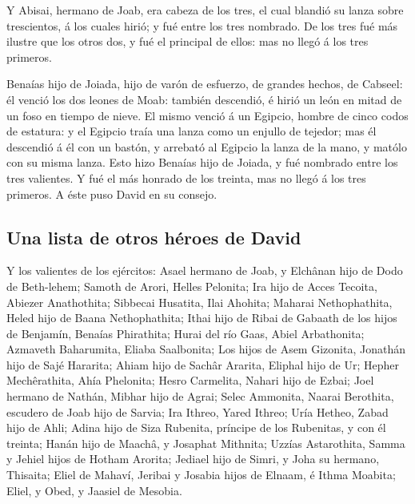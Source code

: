  Y Abisai, hermano de Joab, era cabeza de los tres, el cual
blandió su lanza sobre trescientos, á los cuales hirió; y fué entre los
tres nombrado.  De los tres fué más ilustre que los otros
dos, y fué el principal de ellos: mas no llegó á los tres primeros.

 Benaías hijo de Joiada, hijo de varón de esfuerzo, de
grandes hechos, de Cabseel: él venció los dos leones de Moab: también
descendió, é hirió un león en mitad de un foso en tiempo de nieve.
 El mismo venció á un Egipcio, hombre de cinco codos de
estatura: y el Egipcio traía una lanza como un enjullo de tejedor; mas
él descendió á él con un bastón, y arrebató al Egipcio la lanza de la
mano, y matólo con su misma lanza.  Esto hizo Benaías hijo
de Joiada, y fué nombrado entre los tres valientes.  Y fué
el más honrado de los treinta, mas no llegó á los tres primeros. A éste
puso David en su consejo.

\hypertarget{una-lista-de-otros-huxe9roes-de-david}{%
\subsection{Una lista de otros héroes de
David}\label{una-lista-de-otros-huxe9roes-de-david}}

 Y los valientes de los ejércitos: Asael hermano de Joab, y
Elchânan hijo de Dodo de Beth-lehem;  Samoth de Arori,
Helles Pelonita;  Ira hijo de Acces Tecoita, Abiezer
Anathothita;  Sibbecai Husatita, Ilai Ahohita;
 Maharai Nethophathita, Heled hijo de Baana Nethophathita;
 Ithai hijo de Ribai de Gabaath de los hijos de Benjamín,
Benaías Phirathita;  Hurai del río Gaas, Abiel Arbathonita;
 Azmaveth Baharumita, Eliaba Saalbonita;  Los
hijos de Asem Gizonita, Jonathán hijo de Sajé Hararita; 
Ahiam hijo de Sachâr Ararita, Eliphal hijo de Ur;  Hepher
Mechêrathita, Ahía Phelonita;  Hesro Carmelita, Nahari hijo
de Ezbai;  Joel hermano de Nathán, Mibhar hijo de Agrai;
 Selec Ammonita, Naarai Berothita, escudero de Joab hijo de
Sarvia;  Ira Ithreo, Yared Ithreo;  Uría
Hetheo, Zabad hijo de Ahli;  Adina hijo de Siza Rubenita,
príncipe de los Rubenitas, y con él treinta;  Hanán hijo de
Maachâ, y Josaphat Mithnita;  Uzzías Astarothita, Samma y
Jehiel hijos de Hotham Arorita;  Jediael hijo de Simri, y
Joha su hermano, Thisaita;  Eliel de Mahaví, Jeribai y
Josabia hijos de Elnaam, é Ithma Moabita;  Eliel, y Obed, y
Jaasiel de Mesobia.

